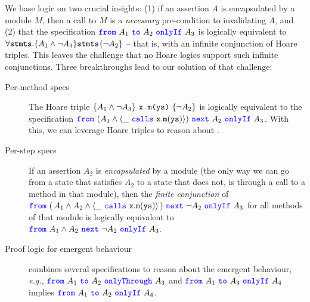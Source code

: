  
 {
 We base \Nec logic on two crucial insights:
 (1) if an assertion $A$ is encapsulated by a module $M$, then a call to $M$ is a \emph{necessary} pre-condition to invalidating $A$,
 and (2) that the specification ${\color{blue}\texttt{from}}\ A_1\ {\color{blue}\texttt{to}}\ A_2\ {\color{blue}\texttt{onlyIf}}\ A_3$ is 
logically equivalent
{to}
 $\forall {\texttt{stmts}}. \{ A_1 \wedge \neg A_3\} {\texttt{stmts}} \{ \neg A_2 \}$ -- that is,
 with an infinite conjunction  of Hoare triples.}
 {This leaves the challenge that no Hoare logics support such infinite conjunctions.
 Three breakthroughs lead to our solution of that challenge:}
 \begin{description}
 \item
 [Per-method specs] 
  The Hoare triple 
$ \{ A_1 \wedge \neg A_3 \} \ {\texttt{x.m(ys)}}\  \{ \neg A_2 \}$ is logically equivalent 
 {to} the specification
$ {\color{blue}\texttt{from}}\ (A_1 \wedge  \langle \_\ {\color{blue}\texttt{calls}}\ {\texttt{x}}.{\texttt{m}}({\texttt{ys}}) \rangle )\ {\color{blue}\texttt{next}}\ A_2\ {\color{blue}\texttt{onlyIf}}\ A_3$.  
With this, we can leverage Hoare triples to reason about .  
 
 \item 
 [Per-step specs] %
 If an assertion $A_2$  is \emph{encapsulated} by a module (\ie the only way we can go from a 
 state that satisfies $A_2$ to a state that does not, is through a call to a method in that module), then
{the
\emph{finite conjunction}
of {$ {\color{blue}\texttt{from}}\ (\, A_1 \wedge A_2 \wedge {\langle \_\ {\color{blue}\texttt{calls}}\ {\texttt{x}}.{\texttt{m}}({\texttt{ys}}) \rangle}\, )\ {\color{blue}\texttt{next}}\ \neg  A_2\ {\color{blue}\texttt{onlyIf}}\ A_3$}
 for all methods of that module is logically equivalent 
 {to}
{$ {\color{blue}\texttt{from}}\ A_1 \wedge A_2\ {\color{blue}\texttt{next}}\ \neg A_2\ {\color{blue}\texttt{onlyIf}}\ A_3$. }}
  \item [Proof logic  for emergent behaviour] %
  combines several specifications to reason about the
  emergent behaviour, \emph{e.g.,} 
   $ {\color{blue}\texttt{from}}\ A_1\ {\color{blue}\texttt{to}}\ A_2\ {\color{blue}\texttt{onlyThrough}}\ A_3$  and $ {\color{blue}\texttt{from}}\ A_1\ {\color{blue}\texttt{to}}\ A_3\ {\color{blue}\texttt{onlyIf}}\ A_4$ implies 
   $ {\color{blue}\texttt{from}}\ A_1\ {\color{blue}\texttt{to}}\ A_2\ {\color{blue}\texttt{onlyIf}}\ A_4$.
 \end{description}



